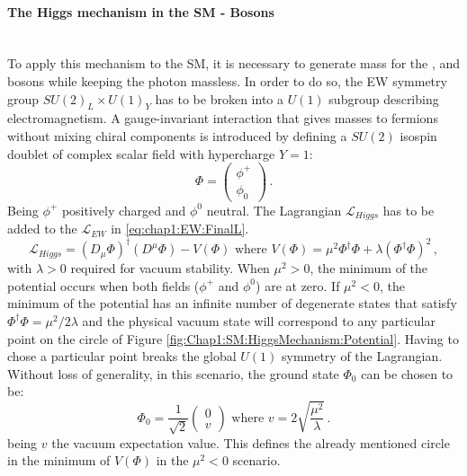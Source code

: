\paragraph{The Higgs mechanism in the SM - Bosons}\mbox{}\\
To apply this mechanism to the SM, it is necessary to generate mass for the \PWplus, \PWminus and \PZ bosons while keeping the photon massless. 
In order to do so, the EW symmetry group $SU(2)_{L} \times U(1)_{Y}$ has to be broken into a $U(1)$ subgroup describing electromagnetism. 
A gauge-invariant interaction that gives masses to fermions without mixing chiral components
is introduced by defining a $SU(2)$ isospin doublet of complex scalar field with hypercharge $Y=1$:
\begin{equation*}
	\Phi = \begin{pmatrix}  \phi^+ \\ \phi_0  \end{pmatrix}\, .
\end{equation*}
Being $\phi^+$ positively charged and $\phi^0$ neutral.  The Lagrangian $\mathcal{L}_{Higgs}$ has to be added to the $\mathcal{L}_{EW}$ in \ref{eq:chap1:EW:FinalL}.
\begin{equation*}\label{eq:chap1:HiggsMechanism:HiggsLagrangianA}
	\mathcal{L}_{Higgs} = (D_{\mu} \Phi)^{\dagger}(D^{\mu} \Phi) - V(\Phi) \textrm{ where } V(\Phi) = \mu^{2}\Phi^{\dagger} \Phi + \lambda (\Phi^{\dagger} \Phi)^{2}\, ,
\end{equation*}
with $\lambda >0$ required for vacuum stability. When $\mu^{2}>0$, the minimum of the potential occurs when both fields ($\phi^+$ and $\phi^0$) are at zero. If $\mu^{2}<0$, the 
minimum of the potential has an infinite number of degenerate states that satisfy $\Phi^{\dagger} \Phi = \mu^{2}/2\lambda$ and the physical vacuum state will correspond 
to any particular point on the circle of Figure \ref{fig:Chap1:SM:HiggsMechanism:Potential}.
Having to chose a particular point breaks the global $U(1)$ symmetry of the Lagrangian. Without loss of generality, in this scenario, the ground state $\Phi_{0}$ can be chosen to be:
\begin{equation*}
	\Phi_{0} = \frac{1}{\sqrt{2}}\begin{pmatrix}  0 \\ v  \end{pmatrix} \textrm{ where } v = 2\sqrt{\frac{\mu^{2}}{\lambda}}\, .
\end{equation*}
being $v$ the vacuum expectation value. This defines the already mentioned circle in the minimum of $V(\Phi)$ in the $\mu^{2}<0$ scenario.

